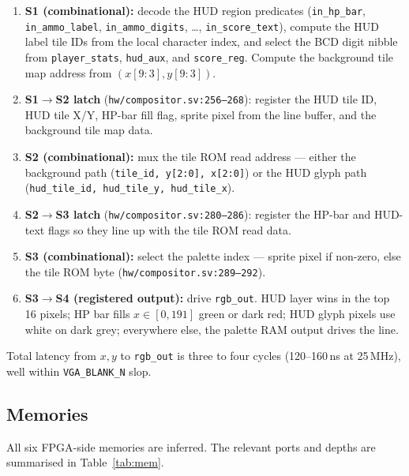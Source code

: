 \documentclass[11pt,letterpaper]{article}
\begin{document}
\begin{enumerate}[leftmargin=*]
  \item \textbf{S1 (combinational):} decode the HUD region predicates
    (\texttt{in\_hp\_bar}, \texttt{in\_ammo\_label}, \texttt{in\_ammo\_digits},
    \dots, \texttt{in\_score\_text}), compute the HUD label tile IDs from the
    local character index, and select the BCD digit nibble from
    \texttt{player\_stats}, \texttt{hud\_aux}, and \texttt{score\_reg}.
    Compute the background tile map address from $(x[9:3], y[9:3])$.
  \item \textbf{S1$\to$S2 latch} (\texttt{hw/compositor.sv:256--268}): register
    the HUD tile ID, HUD tile X/Y, HP-bar fill flag, sprite pixel from the
    line buffer, and the background tile map data.
  \item \textbf{S2 (combinational):} mux the tile ROM read address --- either
    the background path (\texttt{tile\_id, y[2:0], x[2:0]}) or the HUD glyph
    path (\texttt{hud\_tile\_id, hud\_tile\_y, hud\_tile\_x}).
  \item \textbf{S2$\to$S3 latch} (\texttt{hw/compositor.sv:280--286}): register
    the HP-bar and HUD-text flags so they line up with the tile ROM read data.
  \item \textbf{S3 (combinational):} select the palette index --- sprite pixel
    if non-zero, else the tile ROM byte (\texttt{hw/compositor.sv:289--292}).
  \item \textbf{S3$\to$S4 (registered output):} drive \texttt{rgb\_out}. HUD
    layer wins in the top 16 pixels; HP bar fills $x \in [0, 191]$ green or
    dark red; HUD glyph pixels use white on dark grey; everywhere else, the
    palette RAM output drives the line.
\end{enumerate}

Total latency from $x, y$ to \texttt{rgb\_out} is three to four cycles
(120--160\,ns at 25\,MHz), well within \texttt{VGA\_BLANK\_N} slop.

\subsection{Memories}

All six FPGA-side memories are inferred. The relevant ports and depths are
summarised in Table~\ref{tab:mem}.
\end{document}
